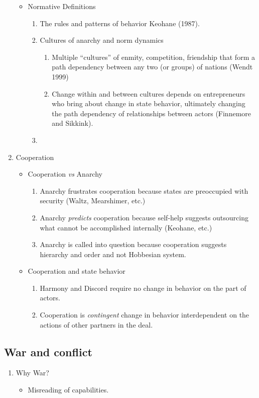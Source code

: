 \documentclass[11pt]{article}
\begin{document}
\begin{enumerate}
\begin{itemize}
\item Normative Definitions
\label{sec-1-1-5-2}
\begin{enumerate}
\item The rules and patterns of behavior Keohane (1987).
\item Cultures of anarchy and norm dynamics
\begin{enumerate}
\item Multiple ``cultures'' of enmity, competition, friendship that form
a path dependency between any two (or groups) of nations (Wendt 1999)
\item Change within and between cultures depends on entrepreneurs who
bring about change in state behavior, ultimately changing the
path dependency of relationships between actors (Finnemore and Sikkink).
\end{enumerate}
\item 
\end{enumerate}
\end{itemize}
\item Cooperation
\label{sec-1-1-6}
\begin{itemize}
\item Cooperation \emph{vs} Anarchy
\label{sec-1-1-6-1}
\begin{enumerate}
\item Anarchy frustrates cooperation because states are preoccupied with
security (Waltz, Mearshimer, etc.)
\item Anarchy \emph{predicts} cooperation because self-help suggests
outsourcing what cannot be accomplished internally (Keohane, etc.)
\item Anarchy is called into question because cooperation suggests
hierarchy and order and not Hobbesian system.
\end{enumerate}
\item Cooperation and state behavior
\label{sec-1-1-6-2}
\begin{enumerate}
\item Harmony and Discord require no change in behavior on the part of actors.
\item Cooperation is \emph{contingent} change in behavior interdependent on
the actions of other partners in the deal.
\end{enumerate}
\end{itemize}
\end{enumerate}

\subsection{War and conflict}
\label{sec-1-2}
\begin{enumerate}
\item Why War?
\label{sec-1-2-1}
\begin{itemize}
\item Misreading of capabilities.
\label{sec-1-2-1-1}
\end{itemize}
\end{enumerate}
\end{document}
